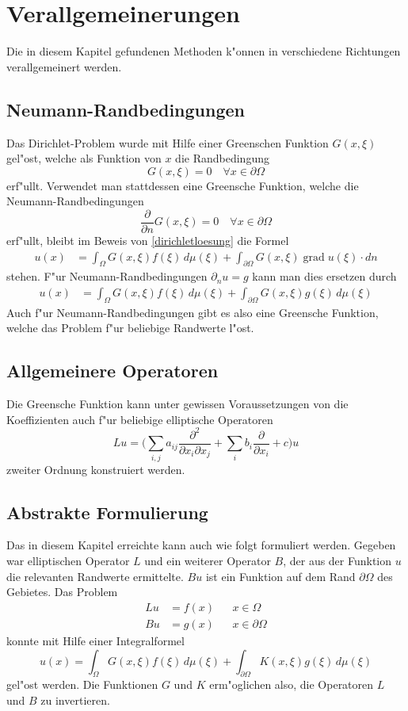 \section{Verallgemeinerungen}
Die in diesem Kapitel gefundenen Methoden k"onnen in verschiedene Richtungen
verallgemeinert werden.
\subsection{Neumann-Randbedingungen}
Das Dirichlet-Problem wurde mit Hilfe einer Greenschen Funktion $G(x,\xi)$
gel"ost, welche als Funktion von $x$ die Randbedingung
\[
G(x,\xi)=0\quad\forall x\in\partial\Omega
\]
erf"ullt.
Verwendet man stattdessen eine Greensche Funktion, welche die
Neumann-Randbedingungen
\[
\frac{\partial}{\partial n}G(x,\xi)=0\quad\forall x\in\partial\Omega
\]
erf"ullt, bleibt im Beweis von \ref{dirichletloesung}
die Formel
\begin{align*}
u(x)&=\int_{\Omega}G(x,\xi)f(\xi)\,d\mu(\xi)+\int_{\partial\Omega}G(x,\xi)\operatorname{grad}u(\xi)\cdot dn
\end{align*}
stehen. F"ur Neumann-Randbedingungen $\partial_n u=g$ kann man dies ersetzen
durch
\begin{align*}
u(x)&=\int_{\Omega}G(x,\xi)f(\xi)\,d\mu(\xi)+\int_{\partial\Omega}G(x,\xi)g(\xi)\,d\mu(\xi)
\end{align*}
Auch f"ur Neumann-Randbedingungen gibt es also eine Greensche Funktion, welche
das Problem f"ur beliebige Randwerte l"ost.

\subsection{Allgemeinere Operatoren}
Die Greensche Funktion kann unter gewissen Voraussetzungen
von die Koeffizienten auch f"ur beliebige elliptische Operatoren
\[
Lu=\biggl(\sum_{i,j}a_{ij}\frac{\partial^2}{\partial x_i\partial x_j}
+\sum_ib_i\frac{\partial}{\partial x_i} +c\biggr)u
\]
zweiter Ordnung konstruiert werden.

\subsection{Abstrakte Formulierung}
Das in diesem Kapitel erreichte kann auch wie folgt formuliert werden.
Gegeben war elliptischen Operator $L$ und ein weiterer Operator $B$,
der aus der Funktion $u$ die relevanten Randwerte ermittelte. $Bu$
ist ein Funktion auf dem Rand $\partial \Omega$ des Gebietes. 
Das Problem
\begin{align*}
Lu&=f(x)&&x\in\Omega
\\
Bu&=g(x)&&x\in\partial\Omega
\end{align*}
konnte mit Hilfe einer Integralformel
\[
u(x)=\int_\Omega G(x,\xi)f(\xi)\,d\mu(\xi)+\int_{\partial \Omega}K(x,\xi)g(\xi)\,d\mu(\xi)
\]
gel"ost werden.
Die Funktionen $G$ und $K$ erm"oglichen also, die Operatoren $L$ und $B$
zu invertieren.



